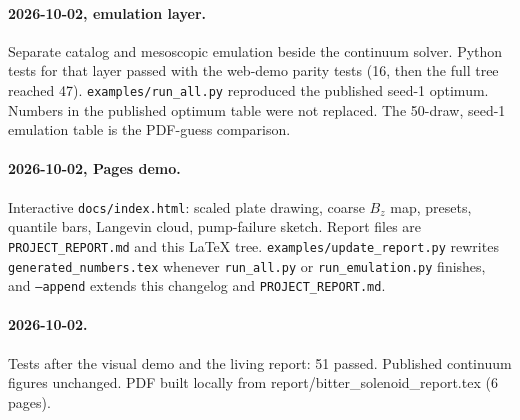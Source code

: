 
\paragraph{2026-10-02, emulation layer.}
Separate catalog and mesoscopic emulation beside the continuum solver.
Python tests for that layer passed with the web-demo parity tests (16, then the full tree reached 47).
\texttt{examples/run\_all.py} reproduced the published seed-1 optimum.
Numbers in the published optimum table were not replaced.
The 50-draw, seed-1 emulation table is the PDF-guess comparison.

\paragraph{2026-10-02, Pages demo.}
Interactive \texttt{docs/index.html}: scaled plate drawing, coarse \(B_z\) map, presets, quantile bars, Langevin cloud, pump-failure sketch.
Report files are \texttt{PROJECT\_REPORT.md} and this LaTeX tree.
\texttt{examples/update\_report.py} rewrites \texttt{generated\_numbers.tex} whenever \texttt{run\_all.py} or \texttt{run\_emulation.py} finishes, and \texttt{--append} extends this changelog and \texttt{PROJECT\_REPORT.md}.
\paragraph{2026-10-02.}
Tests after the visual demo and the living report: 51 passed. Published continuum figures unchanged. PDF built locally from report/bitter\_solenoid\_report.tex (6 pages).

